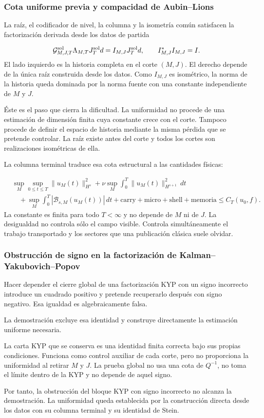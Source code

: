 \subsubsection{Cota uniforme previa y compacidad de Aubin–Lions}
La raíz, el codificador de nivel, la columna y la isometría común satisfacen la factorización derivada desde los datos de partida\par
\[
\mathcal G_{M,J,T}^{\rm sol}
\Lambda_{M,T}
J_T^{\rm sol}d
=
I_{M,J}J_T^{\rm sol}d,
\qquad
I_{M,J}^{*}I_{M,J}=I.
\]
El lado izquierdo es la historia completa en el corte \((M,J)\). El derecho depende de la única raíz construida desde los datos. Como \(I_{M,J}\) es isométrico, la norma de la historia queda dominada por la norma fuente con una constante independiente de \(M\) y \(J\).\par
Éste es el paso que cierra la dificultad. La uniformidad no procede de una estimación de dimensión finita cuya constante crece con el corte. Tampoco procede de definir el espacio de historia mediante la misma pérdida que se pretende controlar. La raíz existe antes del corte y todos los cortes son realizaciones isométricas de ella.\par
La columna terminal traduce esa cota estructural a las cantidades físicas:\par
\[
\begin{aligned}
&\sup_M\sup_{0\le t\le T}\|u_M(t)\|_{H^s}^2
+\nu\sup_M\int_0^T\|u_M(t)\|_{H^{s+1}}^2\,dt\\
&\quad
+\sup_M\int_0^T|\mathscr B_{s,M}(u_M(t))|\,dt
+\text{carry}+\text{micro}+\text{shell}+\text{memoria}
\le C_T(u_0,f).
\end{aligned}
\]
La constante es finita para todo \(T<\infty\) y no depende de \(M\) ni de \(J\). La desigualdad no controla sólo el campo visible. Controla simultáneamente el trabajo transportado y los sectores que una publicación clásica suele olvidar.\par
{}
\subsubsection{Obstrucción de signo en la factorización de Kalman–Yakubovich–Popov}
Hacer depender el cierre global de una factorización KYP con un signo incorrecto introduce un cuadrado positivo y pretende recuperarlo después con signo negativo. Esa igualdad es algebraicamente falsa.\par
La demostración excluye esa identidad y construye directamente la estimación uniforme necesaria.\par
La carta KYP que se conserva es una identidad finita correcta bajo sus propias condiciones. Funciona como control auxiliar de cada corte, pero no proporciona la uniformidad al retirar \(M\) y \(J\). La prueba global no usa una cota de \(Q^{-1}\), no toma el límite dentro de la KYP y no depende de aquel signo.\par
Por tanto, la obstrucción del bloque KYP con signo incorrecto no alcanza la demostración. La uniformidad queda establecida por la construcción directa desde los datos con su columna terminal y su identidad de Stein.\par
{}
